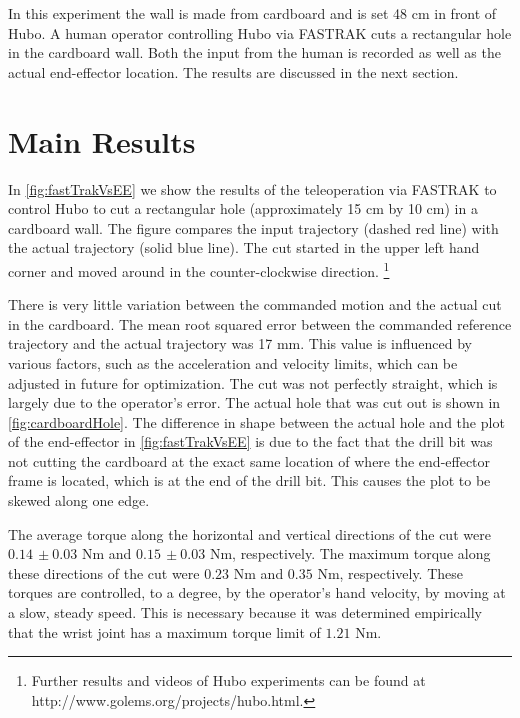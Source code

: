\documentclass[letterpaper, 10 pt, conference]{IEEEtran}
\begin{document}
In this experiment the wall is made from cardboard and is set 48 cm in front of Hubo. A human operator controlling Hubo via FASTRAK cuts a rectangular hole in the cardboard wall. Both the input from the human is recorded as well as the actual end-effector location. The results are discussed in the next section.

\section{Main Results} \label{sec:mainResults}
In \cref{fig:fastTrakVsEE} we show the results of the teleoperation via FASTRAK to control Hubo to cut a rectangular hole (approximately 15 cm by 10 cm) in a cardboard wall. The figure compares the input trajectory (dashed red line) with the actual trajectory (solid blue line). The cut started in the upper left hand corner and moved around in the counter-clockwise direction. \footnote{Further results and videos of Hubo experiments can be found at http://www.golems.org/projects/hubo.html.}

There is very little variation between the commanded motion and the actual cut in the cardboard. The mean root squared error between the commanded reference trajectory and the actual trajectory was 17 mm. This value is influenced by various factors, such as the acceleration and velocity limits, which can be adjusted in future for optimization. The cut was not perfectly straight, which is largely due to the operator's error. The actual hole that was cut out is shown in \cref{fig:cardboardHole}. The difference in shape between the actual hole and the plot of the end-effector in \cref{fig:fastTrakVsEE} is due to the fact that the drill bit was not cutting the cardboard at the exact same location of where the end-effector frame is located, which is at the end of the drill bit. This causes the plot to be skewed along one edge.

The average torque along the horizontal and vertical directions of the cut were $0.14\,\pm0.03$ Nm and $0.15\,\pm0.03$ Nm, respectively. The maximum torque along these directions of the cut were $0.23$ Nm and $0.35$ Nm, respectively. These torques are controlled, to a degree, by the operator's hand velocity, by moving at a slow, steady speed. This is necessary because it was determined empirically that the wrist joint has a maximum torque limit of $1.21$ Nm. 
\end{document}
